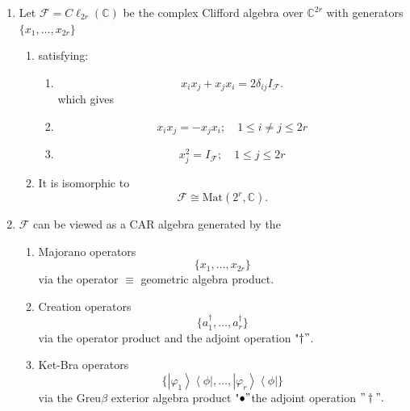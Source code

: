 \documentclass[aps,preprint]{revtex4}
\begin{document}
\begin{enumerate}
\item Let $\mathcal{F}=C\ell _{2r}(\mathbb{C})$ be the complex Clifford
algebra over $\mathbb{C}^{2r}$ with generators $\{x_{1},\ldots ,x_{2r}\}$

\begin{enumerate}
\item satisfying:

\begin{enumerate}
\item 
\begin{equation}
x_{i}x_{j}+x_{j}x_{i}=2\delta _{ij}I_{\mathcal{F}}.
\end{equation}%
which gives

\item 
\begin{equation}
x_{i}x_{j}=-x_{j}x_{i};\quad 1\leq i\neq j\leq 2r
\end{equation}

\item 
\begin{equation}
x_{j}^{2}=I_{\mathcal{F}};\quad 1\leq j\leq 2r
\end{equation}
\end{enumerate}

\item It is isomorphic to 
\begin{equation}
\mathcal{F}\cong \mathrm{Mat}(2^{r},\mathbb{C}).
\end{equation}
\end{enumerate}

\item $\mathcal{F}$ can be viewed as a CAR algebra generated by the

\begin{enumerate}
\item Majorano operators%
\begin{equation}
\{x_{1},\ldots ,x_{2r}\}
\end{equation}%
via the operator $\equiv $ geometric algebra product.

\item Creation operators 
\begin{equation}
\{a_{1}^{\dagger },\ldots ,a_{r}^{\dagger }\}
\end{equation}%
via the operator product and the adjoint operation "$\dagger "$.

\item Ket-Bra operators 
\begin{equation}
\{\left\vert \varphi _{1}\right\rangle \left\langle \phi \right\vert ,\ldots
,\left\vert \varphi _{r}\right\rangle \left\langle \phi \right\vert \}
\end{equation}%
via the Greu$\beta $ exterior algebra product "$\bullet "$the adjoint
operation $"\dagger ".$
\end{enumerate}


\end{enumerate}
\end{document}
